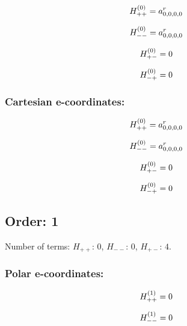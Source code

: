 \documentclass[fleqn]{article}
\begin{document}
\begin{dmath*}
H_{++}^{(0)}=a^{r}_{0,0,0,0}\\
\end{dmath*}

\begin{dmath*}
H_{--}^{(0)}=a^{r}_{0,0,0,0}\\
\end{dmath*}

\begin{dmath*}
H_{+-}^{(0)}=0\\
\end{dmath*}

\begin{dmath*}
H_{-+}^{(0)}=0\\
\end{dmath*}
\subsubsection*{Cartesian e-coordinates:}

\begin{dmath*}
H_{++}^{(0)}=a^{r}_{0,0,0,0}\\
\end{dmath*}

\begin{dmath*}
H_{--}^{(0)}=a^{r}_{0,0,0,0}\\
\end{dmath*}

\begin{dmath*}
H_{+-}^{(0)}=0\\
\end{dmath*}

\begin{dmath*}
H_{-+}^{(0)}=0\\
\end{dmath*}
\subsection{Order: 1}
Number of terms: $H_{++}$: $0$, $H_{--}$: $0$, $H_{+-}$: $4$.
\subsubsection*{Polar e-coordinates:}

\begin{dmath*}
H_{++}^{(1)}=0\\
\end{dmath*}

\begin{dmath*}
H_{--}^{(1)}=0\\
\end{dmath*}
\end{document}
